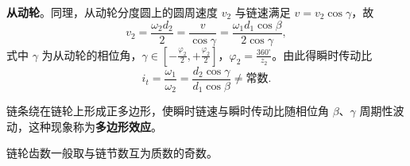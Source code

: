 \textbf{从动轮}。同理，从动轮分度圆上的圆周速度 $v_2$ 与链速满足 $v=v_2\cos\gamma$，故
\begin{equation}
    v_2=\frac{\omega_2d_2}{2}=\frac{v}{\cos\gamma}=\frac{\omega_1d_1\cos\beta}{2\cos\gamma},
    \label{eq:链传动:从动轮圆周速度}
\end{equation}
式中 $\gamma$ 为从动轮的相位角，$\gamma\in\left[-\frac{\varphi_2}{2},+\frac{\varphi_2}{2}\right]$，$\varphi_2=\frac{360^\circ}{z_2}$。由此得瞬时传动比
\begin{equation}
    i_t=\frac{\omega_1}{\omega_2}=\frac{d_2\cos\gamma}{d_1\cos\beta}\neq\text{常数}.
    \label{eq:链传动:瞬时传动比}
\end{equation}

\begin{definition}[多边形效应]
    链条绕在链轮上形成正多边形，使瞬时链速与瞬时传动比随相位角 $\beta$、$\gamma$ 周期性波动，这种现象称为\textbf{多边形效应}。
\end{definition}
\begin{remark}
    链轮齿数一般取与链节数互为质数的奇数。
\end{remark}
